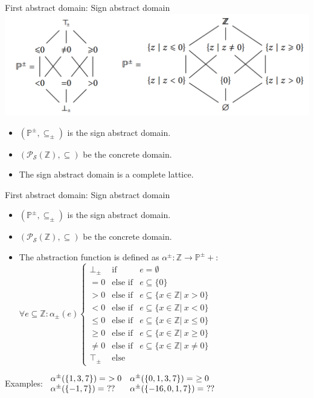 \begin{frame}{First abstract domain: Sign abstract domain}
\centering \includegraphics[scale=0.50]{content/images/static-analysis/sign.png}
\begin{itemize}
	\item $(\mathbb{P}^\pm, \subseteq_\pm)$ is the sign abstract domain.
	\item $(\mathcal{P_S}(\mathbb{Z}),\subseteq)$ be the concrete domain.
	\item The sign abstract domain is a complete lattice.
\end{itemize}
\end{frame}

\begin{frame}{First abstract domain: Sign abstract domain}
\begin{itemize}
	\item $(\mathbb{P}^\pm, \subseteq_\pm)$ is the sign abstract domain.
	\item $(\mathcal{P_S}(\mathbb{Z}),\subseteq)$ be the concrete domain.
	\item The abstraction function is defined as $\alpha^{\pm}: \mathbb{Z} \rightarrow \mathbb{P}^{\pm}+$:\newline
$\forall e \subseteq \mathbb{Z}: \alpha_\pm(e)     \left\{ \begin{array}{rcl}
\bot_{\pm} & \mbox{if}& e= \emptyset \\
=0  & \mbox{else if} & e \subseteq \{0\} \\
>0 & \mbox{else if} & e \subseteq \{x \in \mathbb{Z} |~ x >0\}\\
<0 & \mbox{else if} & e\subseteq \{x \in \mathbb{Z} |~ x <0\}\\
\leq 0 & \mbox{else if} & e\subseteq \{x \in \mathbb{Z} | ~x  \leq 0\}\\
\geq 0 & \mbox{else if} & e\subseteq \{x \in \mathbb{Z} |~ x  \geq 0\}\\
\neq 0 & \mbox{else if} & e\subseteq \{x \in \mathbb{Z} |~ x  \neq 0\}\\
\top_\pm & \mbox{else} & 
\end{array}\right.$
\end{itemize}
\begin{exampleblock}{Examples:}
	$    \begin{array}{l l}
\alpha^{\pm}(\{1,3,7\})=~>0 & \alpha^{\pm}(\{0,1,3,7\})=~\geq 0 \\
\alpha^{\pm}(\{-1,7\})=~ ?? & \alpha^{\pm}(\{-16,0,1,7\})=~ ?? \\
\end{array}$
\end{exampleblock}
\end{frame}

